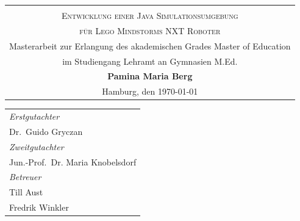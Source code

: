 \begin{titlepage}
\begin{center} 
\vspace{0.5cm} 
\begin{tabular}{c}
 \vspace{1.5cm}\\
\Large \textsc{Entwicklung einer Java Simulationsumgebung}\\
\vspace{0.5cm}
\Large \textsc{für Lego Mindstorms NXT Roboter}\\
\small Masterarbeit zur Erlangung des akademischen Grades Master of Education\\
\vspace{1.25cm}
\small im Studiengang Lehramt an Gymnasien M.Ed.\\
\vspace{1.25cm}
\large \textbf{Pamina Maria Berg}\\
\normalsize Hamburg, den \today
\end{tabular}
\par 
\end{center}
\par
\vspace*{3cm}
\begin{tabular}{l}
\emph{Erstgutachter}\\
Dr.\, Guido Gryczan\\
\emph{Zweitgutachter}\\
Jun.-Prof.\, Dr. Maria Knobelsdorf\\
\emph{Betreuer}\\
Till Aust\\
Fredrik Winkler\\
\end{tabular}

\end{titlepage}
